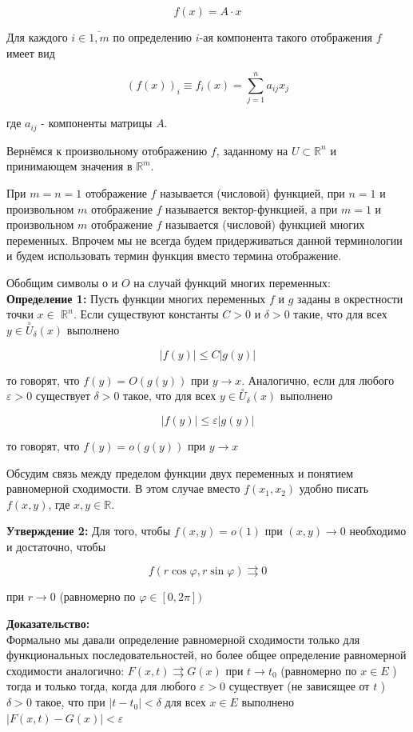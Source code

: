 \documentclass[a4paper,12pt]{article} %
\begin{document}
$$
f(x)=A \cdot x
$$

Для каждого $i \in \overline{1, m}$ по определению $i$-ая компонента такого отображения $f$ имеет вид

$$
(f(x))_{i} \equiv f_{i}(x)=\sum_{j=1}^{n} a_{i j} x_{j}
$$

где $a_{i j}$ - компоненты матрицы $A$.

Вернёмся к произвольному отображению $f$, заданному на $U \subset \mathbb{R}^{n}$ и принимающем значения в $\mathbb{R}^{m}$.

При $m=n=1$ отображение $f$ называется (числовой) функцией, при $n=1$ и произвольном $m$ отображение $f$ называется вектор-функцией, а при $m=1$ и произвольном $m$ отображение $f$ называется (числовой) функцией многих переменных. Впрочем мы не всегда будем придерживаться данной терминологии и будем использовать термин функция вместо термина отображение.

Обобщим символы $о$ и $O$ на случай функций многих переменных:\\
\textbf{Определение 1:} Пусть функции многих переменных $f$ и $g$ заданы в окрестности точки $x \in$ $\mathbb{R}^{n}$. Если существуют константы $C>0$ и $\delta>0$ такие, что для всех $y \in \stackrel{\circ}{U}_{\delta}(x)$ выполнено

$$
|f(y)| \leq C|g(y)|
$$

то говорят, что $f(y)=O(g(y))$ при $y \rightarrow x$. Аналогично, если для любого $\varepsilon>0$ существует $\delta>0$ такое, что для всех $y \in \stackrel{\circ}{U}_{\delta}(x)$ выполнено

$$
|f(y)| \leq \varepsilon|g(y)|
$$

то говорят, что $f(y)=o(g(y))$ при $y \rightarrow x$

Обсудим связь между пределом функции двух переменных и понятием равномерной сходимости. В этом случае вместо $f\left(x_{1}, x_{2}\right)$ удобно писать $f(x, y)$, где $x, y \in \mathbb{R}$.

\textbf{Утверждение 2:} Для того, чтобы $f(x, y)=o(1)$ при $(x, y) \rightarrow 0$ необходимо и достаточно, чтобы

$$
f(r \cos \varphi, r \sin \varphi) \rightrightarrows 0
$$

при $r \rightarrow 0$ (равномерно по $\varphi \in[0,2 \pi])$

\textbf{Доказательство:}\\
Формально мы давали определение равномерной сходимости только для функциональных последовательностей, но более общее определение равномерной сходимости аналогично: $F(x, t) \rightrightarrows G(x)$ при $t \rightarrow t_{0}$ (равномерно по $x \in E$ ) тогда и только тогда, когда для любого $\varepsilon>0$ существует (не зависящее от $t$ ) $\delta>0$ такое, что при $\left|t-t_{0}\right|<\delta$ для всех $x \in E$ выполнено $|F(x, t)-G(x)|<\varepsilon$
\end{document}
